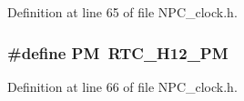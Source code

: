 Definition at line 65 of file N\+P\+C\+\_\+clock.\+h.

\subsubsection[{\texorpdfstring{PM}{PM}}]{\setlength{\rightskip}{0pt plus 5cm}\#define PM~R\+T\+C\+\_\+\+H12\+\_\+\+PM}\hypertarget{group___c_l_o_c_k___format_ga23c7d58108d99a089ce0824823e6b950}{}\label{group___c_l_o_c_k___format_ga23c7d58108d99a089ce0824823e6b950}


Definition at line 66 of file N\+P\+C\+\_\+clock.\+h.

